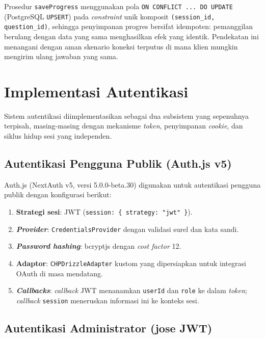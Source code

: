 Prosedur \texttt{saveProgress} menggunakan pola \texttt{ON CONFLICT ... DO UPDATE} (PostgreSQL \texttt{UPSERT}) pada \textit{constraint} unik komposit \texttt{(session\_id, question\_id)}, sehingga penyimpanan progres bersifat idempoten: pemanggilan berulang dengan data yang sama menghasilkan efek yang identik. Pendekatan ini menangani dengan aman skenario koneksi terputus di mana klien mungkin mengirim ulang jawaban yang sama.

\section{Implementasi Autentikasi}
\label{sec:impl-auth}

Sistem autentikasi diimplementasikan sebagai dua subsistem yang sepenuhnya terpisah, masing-masing dengan mekanisme \textit{token}, penyimpanan \textit{cookie}, dan siklus hidup sesi yang independen.

\subsection{Autentikasi Pengguna Publik (Auth.js v5)}

Auth.js (NextAuth v5, versi 5.0.0-beta.30) digunakan untuk autentikasi pengguna publik dengan konfigurasi berikut:

\begin{enumerate}[leftmargin=2cm]
  \item \textbf{Strategi sesi}: JWT (\texttt{session: \{ strategy: "jwt" \}}).
  \item \textbf{\textit{Provider}}: \texttt{CredentialsProvider} dengan validasi surel dan kata sandi.
  \item \textbf{\textit{Password hashing}}: bcryptjs dengan \textit{cost factor} 12.
  \item \textbf{Adaptor}: \texttt{CHPDrizzleAdapter} kustom yang dipersiapkan untuk integrasi OAuth di masa mendatang.
  \item \textbf{\textit{Callbacks}}: \textit{callback} JWT menanamkan \texttt{userId} dan \texttt{role} ke dalam \textit{token}; \textit{callback} \texttt{session} meneruskan informasi ini ke konteks sesi.
\end{enumerate}

\subsection{Autentikasi Administrator (jose JWT)}

